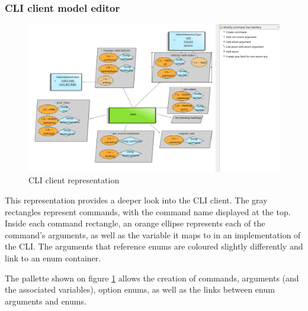\documentclass[parskip=full]{article}
\begin{document}
    \subsubsection{CLI client model editor}
    \begin{figure}
        \includegraphics[height=0.2\paperheight]{cli-editor-with-pallette}
        \caption{CLI client representation}
        \label{fig:cliEditor}
        \vspace{-10em}
    \end{figure}
    This representation provides a deeper look into the CLI client.
    The gray rectangles represent commands, with the command name displayed at the top.
    Inside each command rectangle, an orange ellipse represents each of the command's arguments, as well as the variable it maps to in an implementation of the CLI.
    The arguments that reference enums are coloured slightly differently and link to an enum container.

    The pallette shown on figure \ref{fig:cliEditor} allows the creation of commands, arguments (and the associated variables), option enums, as well as the links between enum arguments and enums.
    \pagebreak
\end{document}
